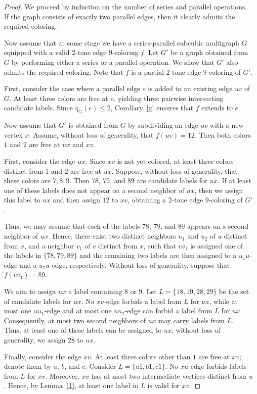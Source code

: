 \documentclass[12pt]{article}
\theoremstyle{plain}
\numberwithin{theorem}{section}
\numberwithin{conjecture}{section}
\numberwithin{corollary}{section}
\numberwithin{example}{section}
\numberwithin{lemma}{section}
\numberwithin{proposition}{section}
\numberwithin{problem}{section}
\numberwithin{remark}{section}
\numberwithin{claim}{theorem}
\numberwithin{definition}{section}
\begin{document}
\begin{proof}
We proceed by induction on the number of series and parallel operations. If the graph consists of exactly two parallel edges, then it clearly admits the required coloring.

\noindent Now assume that at some stage we have a series-parallel subcubic multigraph $G$ equipped with a valid $2$-tone edge $9$-coloring $f$. Let $G'$ be a graph obtained from $G$ by performing either a series or a parallel operation. We show that $G'$ also admits the required coloring. Note that $f$ is a partial $2$-tone edge $9$-coloring of $G'$.

\noindent First, consider the case where a parallel edge $e$ is added to an existing edge $uv$ of $G$. At least three colors are free at $e$, yielding three pairwise intersecting candidate labels. Since $\eta_G(e)\le 2$, Corollary~\ref{x} ensures that $f$ extends to $e$.

\noindent Now assume that $G'$ is obtained from $G$ by subdividing an edge $uv$ with a new vertex $x$. Assume, without loss of generality, that $f(uv)=12$. Then both colors $1$ and $2$ are free at $ux$ and $xv$.

\noindent First, consider the edge $ux$. Since $xv$ is not yet colored, at least three colors distinct from $1$ and $2$ are free at $ux$. Suppose, without loss of generality, that these colors are $7,8,9$. Then $78$, $79$, and $89$ are candidate labels for $ux$. If at least one of these labels does not appear on a second neighbor of $ux$, then we assign this label to $ux$ and then assign $12$ to $xv$, obtaining a $2$-tone edge $9$-coloring of $G'$.

\noindent Thus, we may assume that each of the labels $78$, $79$, and $89$ appears on a second neighbor of $ux$. Hence, there exist two distinct neighbors $u_1$ and $u_2$ of $u$ distinct from $x$, and a neighbor $v_1$ of $v$ distinct from $x$, such that $vv_1$ is assigned one of the labels in $\{78,79,89\}$ and the remaining two labels are then assigned to a $u_1u$-edge and a $u_2u$-edge, respectively. Without loss of generality, suppose that $f(vv_1)=89$.

\noindent We aim to assign $ux$ a label containing $8$ or $9$. Let $L=\{18, 19, 28, 29\}$ be the set of candidate labels for $ux$. No $xv$-edge forbids a label from $L$ for $ux$, while at most one $uu_1$-edge and at most one $uu_2$-edge can forbid a label from $L$ for $ux$. Consequently, at most two second neighbors of $ux$ may carry labels from $L$. Thus, at least one of these labels can be assigned to $ux$; without loss of generality, we assign $28$ to $ux$.

\noindent Finally, consider the edge $xv$. At least three colors other than $1$ are free at $xv$; denote them by $a$, $b$, and $c$. Consider $L=\{a1,b1,c1\}$. No $xu$-edge forbids labels from $L$ for $xv$. Moreover, $xv$ has at most two intermediate vertices distinct from $u$. Hence, by Lemma \ref{l1}, at least one label in $L$ is valid for $xv$.\end{proof}
\end{document}
